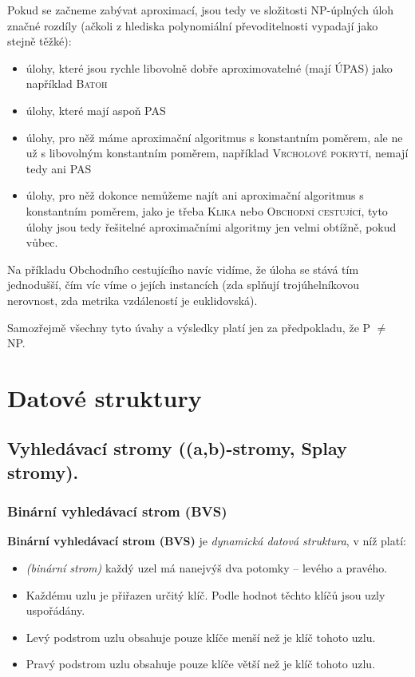 \documentclass[11pt]{report} %
\numberwithin{equation}{section}
\begin{document}
Pokud se začneme zabývat aproximací, jsou tedy ve složitosti NP-úplných úloh značné rozdíly (ačkoli z hlediska polynomiální převoditelnosti vypadají jako stejně těžké):
\begin{itemize}
	
	
	\item úlohy, které jsou rychle libovolně dobře aproximovatelné (mají ÚPAS) jako například \textsc{Batoh}
	\item úlohy, které mají aspoň PAS
	\item úlohy, pro něž máme aproximační algoritmus s konstantním poměrem, ale ne už s libovolným konstantním poměrem,
	například \textsc{Vrcholové pokrytí}, nemají tedy ani PAS
	\item úlohy, pro něž dokonce nemůžeme najít ani aproximační algoritmus s konstantním poměrem, jako je třeba \textsc{Klika} nebo \textsc{Obchodní cestující}, tyto úlohy jsou tedy řešitelné aproximačními algoritmy jen velmi obtížně, pokud vůbec.
\end{itemize} 
Na příkladu Obchodního cestujícího navíc vidíme, že úloha se stává tím jednodušší, čím víc víme o jejích instancích (zda splňují trojúhelníkovou nerovnost, zda metrika vzdáleností je euklidovská). 

Samozřejmě všechny tyto úvahy a výsledky platí jen za předpokladu, že P $\neq$ NP.




\chapter{Datové struktury}
\section{Vyhledávací stromy ((a,b)-stromy, Splay stromy).}

\subsection{Binární vyhledávací strom (BVS)}
\textbf{Binární vyhledávací strom (BVS)} je \textit{dynamická datová struktura}, v níž platí:
\begin{itemize}
	
	
	\item \textit{(binární strom)} každý uzel má nanejvýš dva potomky -- levého a pravého.
	\item Každému uzlu je přiřazen určitý klíč. Podle hodnot těchto klíčů jsou uzly uspořádány.
	\item Levý podstrom uzlu obsahuje pouze klíče menší než je klíč tohoto uzlu.
	\item Pravý podstrom uzlu obsahuje pouze klíče větší než je klíč tohoto uzlu.
\end{itemize}
\end{document}
